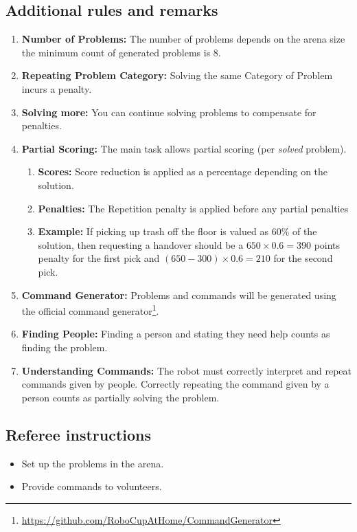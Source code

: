 \subsection*{Additional rules and remarks}
\begin{enumerate}[nosep]
	\item \textbf{Number of Problems:} The number of problems depends on the arena size the minimum count of generated problems is 8.
	\item \textbf{Repeating Problem Category:} Solving the same Category of Problem incurs a penalty. 
	\item \textbf{Solving more:} You can continue solving problems to compensate for penalties.
	\item \textbf{Partial Scoring:} The main task allows partial scoring (per \emph{solved} problem).
	\begin{enumerate}[nosep]
		\item \textbf{Scores:} Score reduction is applied as a percentage depending on the solution.
		\item \textbf{Penalties:} The Repetition penalty is applied before any partial penalties
		\item \textbf{Example:} If picking up trash off the floor is valued as 60\% of the solution, then requesting a handover should be a $ 650 \times 0.6 = 390 $ points penalty for the first pick and  $ \left( 650 - 300 \right) \times 0.6 = 210 $ for the second pick.
	\end{enumerate}
	\item \textbf{Command Generator:} Problems and commands will be generated using the official command generator\footnote{\url{https://github.com/RoboCupAtHome/CommandGenerator}}.
	\item \textbf{Finding People:} Finding a person and stating they need help counts as finding the problem.
	\item \textbf{Understanding Commands:} The robot must correctly interpret and repeat commands given by people. Correctly repeating the command given by a person counts as partially solving the problem.
\end{enumerate}

\subsection*{Referee instructions}
\begin{itemize}
	\item Set up the problems in the arena.
	\item Provide commands to volunteers.
\end{itemize}

